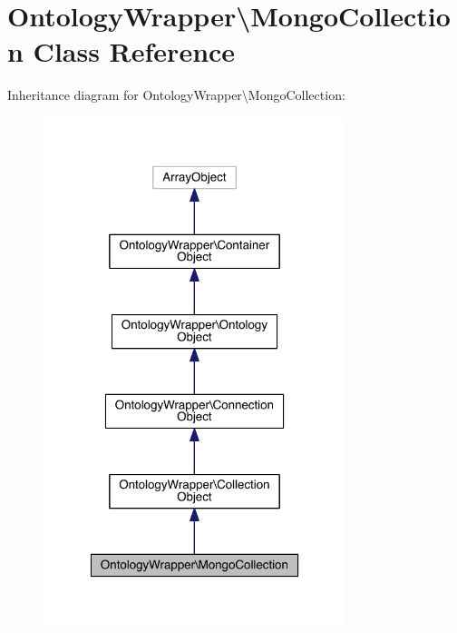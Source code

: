 \hypertarget{class_ontology_wrapper_1_1_mongo_collection}{\section{Ontology\-Wrapper\textbackslash{}Mongo\-Collection Class Reference}
\label{class_ontology_wrapper_1_1_mongo_collection}
}


Inheritance diagram for Ontology\-Wrapper\textbackslash{}Mongo\-Collection\-:\nopagebreak
\begin{figure}[H]
\begin{center}
\leavevmode
\includegraphics[width=250pt]{class_ontology_wrapper_1_1_mongo_collection__inherit__graph}
\end{center}
\end{figure}



